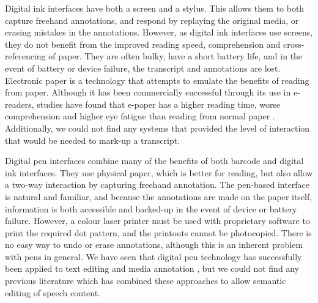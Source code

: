 Digital ink interfaces have both a screen and a stylus. This allows them to both capture freehand annotations, and
respond by replaying the original media, or erasing mistakes in the annotations.  However, as digital ink interfaces
use screens, they do not benefit from the improved reading speed, comprehension and cross-referencing of paper. They
are often bulky, have a short battery life, and in the event of battery or device failure, the transcript and
annotations are lost.  Electronic paper is a technology that attempts to emulate the benefits of reading from paper.
Although it has been commercially successful through its use in e-readers, studies have found that e-paper has a higher
reading time, worse comprehension and higher eye fatigue than reading from normal paper \citep{Jeong2012, Daniel2013}.
Additionally, we could not find any systems that provided the level of interaction that would be needed to mark-up a
transcript.



Digital pen interfaces combine many of the benefits of both barcode and digital ink interfaces. They use physical
paper, which is better for reading, but also allow a two-way interaction by capturing freehand annotation. The
pen-based interface is natural and familiar, and because the annotations are made on the paper itself, information is
both accessible and backed-up in the event of device or battery failure. However, a colour laser printer must be used
with proprietary software to print the required dot pattern, and the printouts cannot be photocopied. There is no easy
way to undo or erase annotations, although this is an inherent problem with pens in general.  We have seen that digital
pen technology has successfully been applied to text editing \citep{Weibel2008} and media annotation \citep{Fouse2011},
but we could not find any previous literature which has combined these approaches to allow semantic editing of speech
content.

